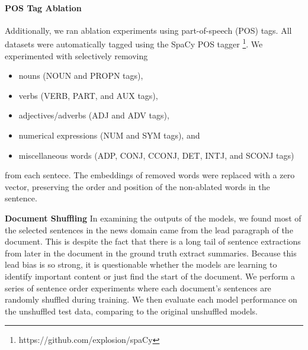 \paragraph{POS Tag Ablation}{Additionally, we ran ablation experiments
using part-of-speech (POS) tags. 
All datasets were automatically tagged using
the SpaCy POS tagger \footnote{https://github.com/explosion/spaCy}.   
We experimented with selectively removing 
\begin{itemize}
    \item nouns (NOUN and PROPN tags), 
    \item verbs (VERB, PART, and AUX tags), 
    \item adjectives/adverbs (ADJ and ADV tags), 
    \item numerical expressions (NUM and SYM tags), and 
    \item miscellaneous words (ADP, CONJ, CCONJ, DET, INTJ, and SCONJ tags)
\end{itemize}
from each sentece. 
The embeddings of removed words were replaced with a zero vector,
preserving the order and position of the non-ablated words in the sentence.
}

\textbf{Document Shuffling} In examining the outputs of the models, we found
most of the selected sentences in the news domain came from the lead paragraph
of the document. This is despite the fact that there is a long tail of 
sentence extractions from later in the document in the ground truth extract 
summaries. Because this lead bias is so strong, it is questionable whether
the models are learning to identify important content or just find the start
of the document. We perform a series of sentence order experiments where 
each document's sentences are randomly shuffled during training. We then
evaluate each model performance on the unshuffled test data, comparing to 
the original unshuffled models. 






